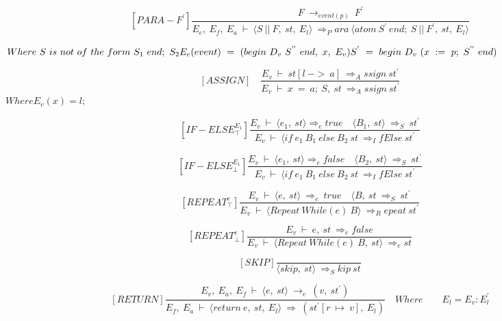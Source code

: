    	\[
   	[PARA-F^{'}]
   	\dfrac{F \ \rightarrow_{event(p)} \ F^{'}}{E_e, \ E_f, \ E_a \ \vdash \ \langle S \ || \ F, \ st, \ E_l \rangle \ \Rightarrow_Para \ \langle atom \ S^{'} \ end; \ S \ || \ F^{'}, \ st, \ E_l \rangle}
   	\]
   	
   	\begin{math}
   		Where \ S \ is \ not \ of \ the \ form \ S_1 \ end; \ S_2 \newline
	   	E_e(event) \ = \ (begin \ D_v \ S^{''} \ end, \ x, \ E_v) \newline
	   	S^{'} \ = \ begin \ D_v \ (x \ := \ p; \ S^{''} \ end)
   	\end{math}
   	
   	\[
   	[ASSIGN] \quad
   	\dfrac{E_v \ \vdash \ st[l \ -> \ a] \ \Rightarrow_Assign \ st^{'}}{E_v \ \vdash \ x \ = \ a; \ S, \ st \ \Rightarrow_Assign \ st^{'}}
   	\]
   	\begin{math}
   		Where E_v(x) = l;
   	\end{math}
   	
   	\[
   	[IF-ELSE^{E_1}_\top]
   	\dfrac{E_v \ \vdash \ \langle e_1, \ st \rangle \Rightarrow_e true \quad \langle B_1, \ st \rangle \ \Rightarrow_S \ st^{'}}{E_v \ \vdash \ \langle if \ e_1 \ B_1 \ else \ B_2 \ st \ \Rightarrow_IfElse \ st^{'}}
   	\]
   	
   	\[
   	[IF-ELSE^{E_1}_\bot]
   	\dfrac{E_v \ \vdash \ \langle e_1, \ st \rangle \Rightarrow_e false \quad \langle B_2, \ st \rangle \ \Rightarrow_S \ st^{'}}{E_v \ \vdash \ \langle if \ e_1 \ B_1 \ else \ B_2 \ st \ \Rightarrow_IfElse \ st^{'}}
   	\]
   	
   	\[
   	[REPEAT^e_\top]
   	\dfrac{E_v \ \vdash \ \langle e, \ st \rangle \ \Rightarrow_e \ true \quad \langle B, \ st \ \Rightarrow_S \ st^{'}}{E_v \ \vdash \ \langle Repeat \ While(e) \ B \rangle \ \Rightarrow_Repeat \ st^{'}}
   	\]
   	
   	\[
   	[REPEAT^e_\bot]
   	\dfrac{E_v \ \vdash \ e, \ st \ \Rightarrow_e false}{E_v \ \vdash \ \langle Repeat \ While(e) \ B, \ st\rangle \ \Rightarrow_e st}
   	\]
   	
   	\[
   	[SKIP]
   	\dfrac{}{\langle skip, \ st \rangle \ \Rightarrow_Skip \ st}
   	\]
   	
   	\[
   	[RETURN]
   	\dfrac{E_v, \ E_a, \ E_f \ \vdash \ \langle e, \ st \rangle \ \rightarrow_e \ (v, \ st^{'})}{E_f, \ E_a \ \vdash \ \langle return \ e, \ st, \ E_l \rangle \ \Rightarrow \ (st^{'}[r \ \mapsto \ v], \ E_l)}
   	\quad Where
   	\qquad E_l = E_v : E_l^{'}
   	\]
   	
